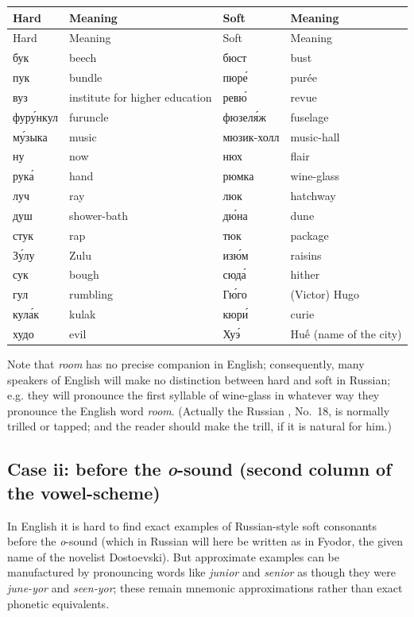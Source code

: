 \begingroup
\small
\setlength{\tabcolsep}{4pt}
\renewcommand{\arraystretch}{1.03}
\begin{longtable}{@{}>{\cyrillicfont}p{29mm} p{38mm} >{\cyrillicfont}p{34mm} p{40mm}@{}}
\toprule
\normalfont Hard & Meaning & \normalfont Soft & Meaning\\
\midrule
\endfirsthead
\toprule
\normalfont Hard & Meaning & \normalfont Soft & Meaning\\
\midrule
\endhead
бук & beech & бюст & bust\\
пук & bundle & пюре́ & purée\\
вуз & institute for higher education & ревю́ & revue\\
фуру́нкул & furuncle & фюзеля́ж & fuselage\\
му́зыка & music & мюзик-холл & music-hall\\
ну & now & нюх & flair\\
рука́ & hand & рюмка & wine-glass\\
луч & ray & люк & hatchway\\
душ & shower-bath & дю́на & dune\\
стук & rap & тюк & package\\
Зу́лу & Zulu & изю́м & raisins\\
сук & bough & сюда́ & hither\\
гул & rumbling & Гю́го & (Victor) Hugo\\
кула́к & kulak & кюри́ & curie\\
худо & evil & Хуэ́ & Huế (name of the city)\\
\bottomrule
\end{longtable}
\endgroup

Note that \emph{room} has no precise companion in English; consequently, many speakers of English will make no distinction between hard and soft  in Russian; e.g. they will pronounce the first syllable of  wine-glass in whatever way they pronounce the English word \emph{room}. (Actually the Russian , No.~18, is normally trilled or tapped; and the reader should make the trill, if it is natural for him.)

\subsection*{Case ii: before the \emph{o}-sound (second column of the vowel-scheme)}

In English it is hard to find exact examples of Russian-style soft consonants before the \emph{o}-sound (which in Russian will here be written  as in  Fyodor, the given name of the novelist Dostoevski). But approximate examples can be manufactured by pronouncing words like \emph{junior} and \emph{senior} as though they were \emph{june-yor} and \emph{seen-yor}; these remain mnemonic approximations rather than exact phonetic equivalents.

